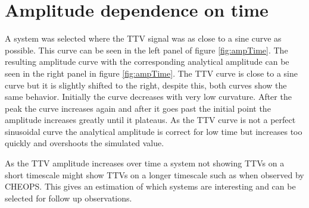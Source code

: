 \documentclass[12pt]{report}
\begin{document}
\section{Amplitude dependence on time}
	A system was selected where the TTV signal was as close to a sine curve as possible. This curve can be seen in the left panel of figure \ref{fig:ampTime}. The resulting amplitude curve with the corresponding analytical amplitude can be seen in the right panel in figure \ref{fig:ampTime}. The TTV curve is close to a sine curve but it is slightly shifted to the right, despite this, both curves show the same behavior. Initially the curve decreases with very low curvature. After the peak the curve increases again and after it goes past the initial point the amplitude increases greatly until it plateaus. As the TTV curve is not a perfect sinusoidal curve the analytical amplitude is correct for low time but increases too quickly and overshoots the simulated value. 
	
	As the TTV amplitude increases over time a system not showing TTVs on a short timescale might show TTVs on a longer timescale such as when observed by CHEOPS. This gives an estimation of which systems are interesting and can be selected for follow up observations.
\end{document}
